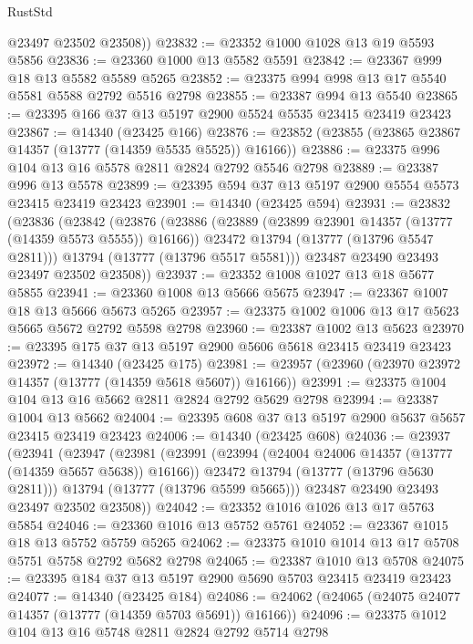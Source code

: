 \begin{lexlean}{RustStd}
\begin{coremodule}
        @23497
        @23502
        @23508))
@23832 := @23352 @1000 @1028 @13 @19 @5593 @5856
@23836 := @23360 @1000 @13 @5582 @5591
@23842 := @23367 @999 @18 @13 @5582 @5589 @5265
@23852 := @23375 @994 @998 @13 @17 @5540 @5581 @5588 @2792 @5516 @2798
@23855 := @23387 @994 @13 @5540
@23865 := @23395 @166 @37 @13 @5197 @2900 @5524 @5535 @23415 @23419 @23423
@23867 := @14340 (@23425 @166)
@23876 := @23852 (@23855 (@23865 @23867 @14357 (@13777 (@14359 @5535 @5525)) @16166))
@23886 := @23375 @996 @104 @13 @16 @5578 @2811 @2824 @2792 @5546 @2798
@23889 := @23387 @996 @13 @5578
@23899 := @23395 @594 @37 @13 @5197 @2900 @5554 @5573 @23415 @23419 @23423
@23901 := @14340 (@23425 @594)
@23931 := @23832
    (@23836
      (@23842
        (@23876
          (@23886
            (@23889 (@23899 @23901 @14357 (@13777 (@14359 @5573 @5555)) @16166))
            @23472
            @13794
            (@13777 (@13796 @5547 @2811)))
          @13794
          (@13777 (@13796 @5517 @5581)))
        @23487
        @23490
        @23493
        @23497
        @23502
        @23508))
@23937 := @23352 @1008 @1027 @13 @18 @5677 @5855
@23941 := @23360 @1008 @13 @5666 @5675
@23947 := @23367 @1007 @18 @13 @5666 @5673 @5265
@23957 := @23375 @1002 @1006 @13 @17 @5623 @5665 @5672 @2792 @5598 @2798
@23960 := @23387 @1002 @13 @5623
@23970 := @23395 @175 @37 @13 @5197 @2900 @5606 @5618 @23415 @23419 @23423
@23972 := @14340 (@23425 @175)
@23981 := @23957 (@23960 (@23970 @23972 @14357 (@13777 (@14359 @5618 @5607)) @16166))
@23991 := @23375 @1004 @104 @13 @16 @5662 @2811 @2824 @2792 @5629 @2798
@23994 := @23387 @1004 @13 @5662
@24004 := @23395 @608 @37 @13 @5197 @2900 @5637 @5657 @23415 @23419 @23423
@24006 := @14340 (@23425 @608)
@24036 := @23937
    (@23941
      (@23947
        (@23981
          (@23991
            (@23994 (@24004 @24006 @14357 (@13777 (@14359 @5657 @5638)) @16166))
            @23472
            @13794
            (@13777 (@13796 @5630 @2811)))
          @13794
          (@13777 (@13796 @5599 @5665)))
        @23487
        @23490
        @23493
        @23497
        @23502
        @23508))
@24042 := @23352 @1016 @1026 @13 @17 @5763 @5854
@24046 := @23360 @1016 @13 @5752 @5761
@24052 := @23367 @1015 @18 @13 @5752 @5759 @5265
@24062 := @23375 @1010 @1014 @13 @17 @5708 @5751 @5758 @2792 @5682 @2798
@24065 := @23387 @1010 @13 @5708
@24075 := @23395 @184 @37 @13 @5197 @2900 @5690 @5703 @23415 @23419 @23423
@24077 := @14340 (@23425 @184)
@24086 := @24062 (@24065 (@24075 @24077 @14357 (@13777 (@14359 @5703 @5691)) @16166))
@24096 := @23375 @1012 @104 @13 @16 @5748 @2811 @2824 @2792 @5714 @2798

\end{coremodule}
\end{lexlean}
